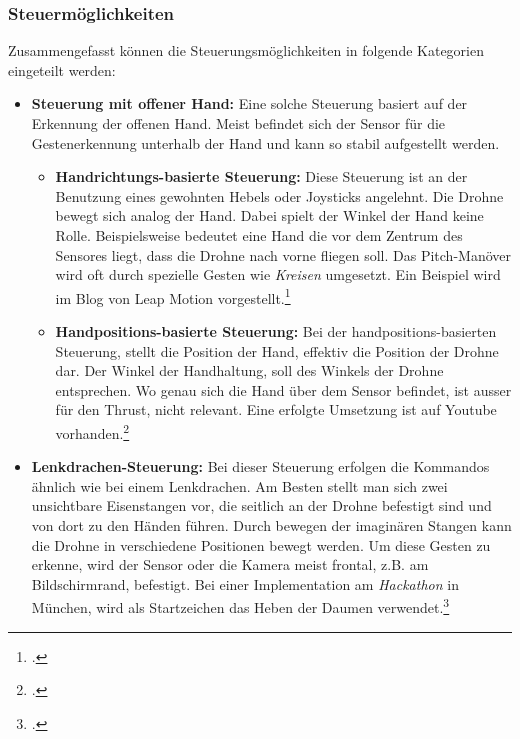 \subsubsection{Steuermöglichkeiten}
Zusammengefasst können die Steuerungsmöglichkeiten in folgende Kategorien eingeteilt werden:
\begin{itemize}

	\item \textbf{Steuerung mit offener Hand:}
	Eine solche Steuerung basiert auf der Erkennung der offenen Hand.
	Meist befindet sich der Sensor für die Gestenerkennung unterhalb der Hand und kann so stabil aufgestellt werden.

		\begin{itemize}

			\item \textbf{Handrichtungs-basierte Steuerung:}
			Diese Steuerung ist an der Benutzung eines gewohnten Hebels oder Joysticks angelehnt. Die Drohne bewegt sich analog der Hand. Dabei spielt der Winkel der Hand keine Rolle.
			Beispielsweise bedeutet eine Hand die vor dem Zentrum des Sensores liegt, dass die Drohne nach vorne fliegen soll. Das Pitch-Manöver wird oft durch spezielle Gesten wie \textit{Kreisen} umgesetzt.
			Ein Beispiel wird im Blog von Leap Motion vorgestellt.\footcite{The_Beginning_of_a_Drone_Revolution_Leap_Motion_Blog_2015-04-29}

			\item \textbf{Handpositions-basierte Steuerung:}
			Bei der handpositions-basierten Steuerung, stellt die Position der Hand, effektiv die Position der Drohne dar. Der Winkel der Handhaltung, soll des Winkels der Drohne entsprechen.
			Wo genau sich die Hand über dem Sensor befindet, ist ausser für den Thrust, nicht relevant.
			Eine erfolgte Umsetzung ist auf Youtube vorhanden.\footcite{Flying_the_Crazyflie_with_Leap_Motion_YouTube_2015-04-29}
		\end{itemize}

	\item \textbf{Lenkdrachen-Steuerung:}
	Bei dieser Steuerung erfolgen die Kommandos ähnlich wie bei einem Lenkdrachen.
	Am Besten stellt man sich zwei unsichtbare Eisenstangen vor, die seitlich an der Drohne befestigt sind und von dort zu den Händen führen. Durch bewegen der imaginären Stangen kann die Drohne in verschiedene Positionen bewegt werden.
	Um diese Gesten zu erkenne, wird der Sensor oder die Kamera meist frontal, z.B. am Bildschirmrand, befestigt.
	Bei einer Implementation am \textit{Hackathon} in München, wird als Startzeichen das Heben der Daumen verwendet.\footcite{Drones_Fly_Hands_Free_with_Gestural_Technology_2015-04-29}


\end{itemize}
